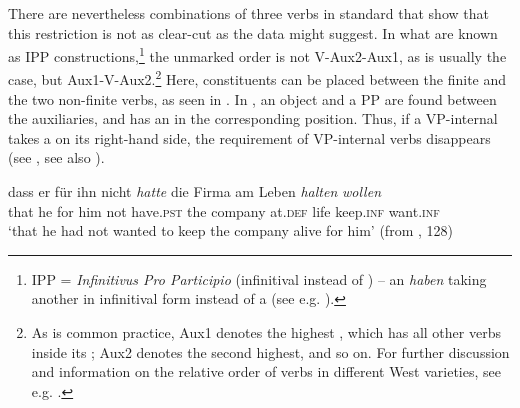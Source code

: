 \documentclass[output=paper, colorlinks, citecolor=brown]{langscibook}
\begin{document}
\ea {}\label{ex:sangfelt:18}

\z 
\z

There are nevertheless combinations of three verbs in standard  that show that this restriction is not as clear-cut as the  data might suggest. In what are known as IPP constructions,\footnote{IPP = \textit{Infinitivus Pro Participio} (infinitival instead of ) – an  \textit{haben} taking another  in infinitival form instead of a  (see e.g. \citealt[46–48]{Wurmbrand2004}).} the unmarked order is not V-Aux2-Aux1, as is usually the case, but Aux1-V-Aux2.\footnote{As is common practice, Aux1 denotes the highest , which has all other verbs inside its ; Aux2 denotes the second highest, and so on. For further discussion and information on the relative order of verbs in different West  varieties, see e.g. \citet{Wurmbrand2004,Sapp2011,Culicover2014}.} Here, constituents can be placed between the finite  and the two non-finite verbs, as seen in . In , an object and a PP are found between the auxiliaries, and  has an  in the corresponding position. Thus, if a VP-internal  takes a   on its right-hand side, the  requirement of VP-internal verbs disappears (see \citealt[97–102]{Sheehan2017Final}, see also \cites[]{Haider2003}[132–135]{Haider2013}).


\ea {}
\label{ex:sangfelt:19}
\ea\label{ex:sangfelt:19a}
\gll dass er für ihn nicht \textit{hatte} {die} {Firma} am Leben \textit{halten} \textit{wollen} \\
 that he for him not have.\textsc{pst} the company at.\textsc{def} life keep.\textsc{inf} want.\textsc{inf} \\
\glt ‘that he had not wanted to keep the company alive for him’ (from \citealt{Haider2013}, 128)
\end{document}
